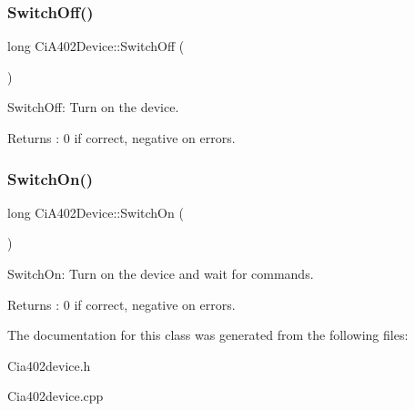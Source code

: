 \subsubsection{\texorpdfstring{Switch\+Off()}{SwitchOff()}}
{\footnotesize\ttfamily long Ci\+A402\+Device\+::\+Switch\+Off (\begin{DoxyParamCaption}{ }\end{DoxyParamCaption})}



Switch\+Off\+: Turn on the device. 

\begin{DoxyReturn}{Returns}
\+: 0 if correct, negative on errors. 
\end{DoxyReturn}
\mbox{\label{classCiA402Device_ab77bce0d7f42429f5f8f092aacb02754}} 
\subsubsection{\texorpdfstring{Switch\+On()}{SwitchOn()}}
{\footnotesize\ttfamily long Ci\+A402\+Device\+::\+Switch\+On (\begin{DoxyParamCaption}{ }\end{DoxyParamCaption})}



Switch\+On\+: Turn on the device and wait for commands. 

\begin{DoxyReturn}{Returns}
\+: 0 if correct, negative on errors. 
\end{DoxyReturn}


The documentation for this class was generated from the following files\+:\begin{DoxyCompactItemize}
\item 
Cia402device.\+h\item 
Cia402device.\+cpp\end{DoxyCompactItemize}
